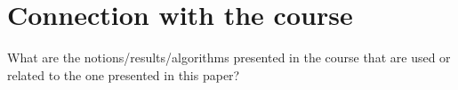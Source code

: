 \section{Connection with the course}

What are the notions/results/algorithms presented in the course that are used or related to the one presented in this paper?